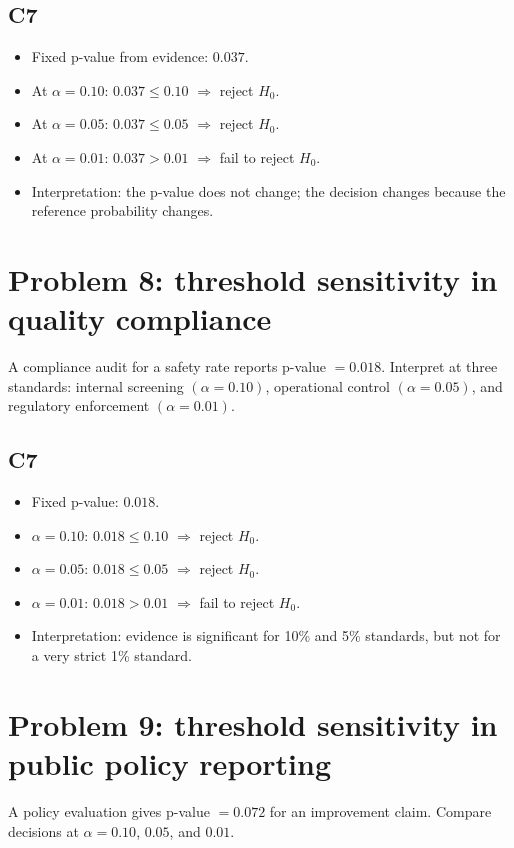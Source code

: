 \begin{ExamProblems}
\subsection*{C7}
\begin{itemize}
    \item Fixed p-value from evidence: \(0.037\).
    \item At \(\alpha=0.10\): \(0.037\le 0.10\) \(\Rightarrow\) reject \(H_0\).
    \item At \(\alpha=0.05\): \(0.037\le 0.05\) \(\Rightarrow\) reject \(H_0\).
    \item At \(\alpha=0.01\): \(0.037>0.01\) \(\Rightarrow\) fail to reject \(H_0\).
    \item Interpretation: the p-value does not change; the decision changes because the reference probability changes.
\end{itemize}

\item
\section{Problem 8: threshold sensitivity in quality compliance}
A compliance audit for a safety rate reports p-value \(=0.018\).
Interpret at three standards: internal screening \((\alpha=0.10)\), operational control \((\alpha=0.05)\), and regulatory enforcement \((\alpha=0.01)\).

\subsection*{C7}
\begin{itemize}
    \item Fixed p-value: \(0.018\).
    \item \(\alpha=0.10\): \(0.018\le 0.10\) \(\Rightarrow\) reject \(H_0\).
    \item \(\alpha=0.05\): \(0.018\le 0.05\) \(\Rightarrow\) reject \(H_0\).
    \item \(\alpha=0.01\): \(0.018>0.01\) \(\Rightarrow\) fail to reject \(H_0\).
    \item Interpretation: evidence is significant for 10\% and 5\% standards, but not for a very strict 1\% standard.
\end{itemize}

\item
\section{Problem 9: threshold sensitivity in public policy reporting}
A policy evaluation gives p-value \(=0.072\) for an improvement claim.
Compare decisions at \(\alpha=0.10\), \(0.05\), and \(0.01\).


\end{ExamProblems}
